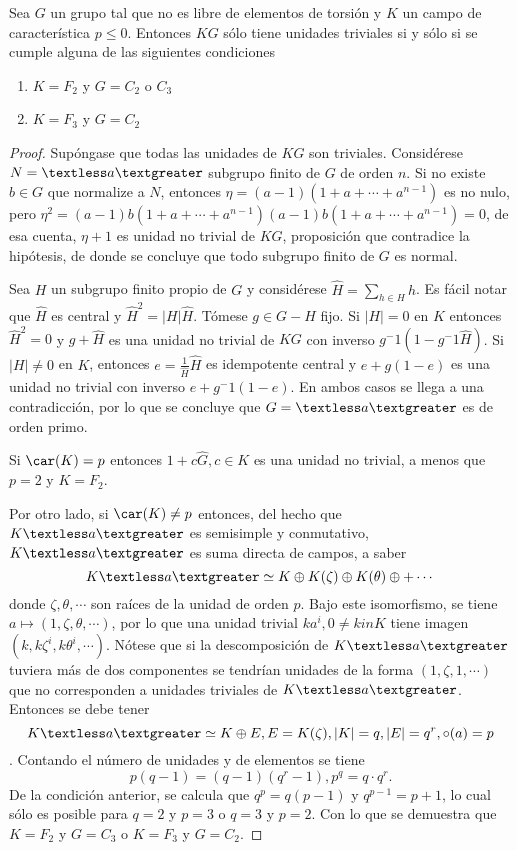 \begin{proposicion}\label{prop:UnidadesTriviales}
Sea $G$ un grupo tal que no es libre de elementos de torsión y $K$ un campo de característica $p\leq 0$. Entonces $KG$ sólo tiene unidades triviales si y sólo si se cumple alguna de las siguientes condiciones
\begin{enumerate}
\item $K=F_2$ y $G=C_2$ o $C_3$
\item $K=F_3$ y $G=C_2$
\end{enumerate}
\end{proposicion}
\begin{proof}
Supóngase que todas las unidades de $KG$ son triviales. Considérese $N=\textless a \textgreater$ subgrupo finito de $G$ de orden $n$. Si no existe $b \in G$ que normalize a $N$, entonces $\eta = (a-1)(1+a+\cdots + a^{n-1})$ es no nulo, pero $\eta^2 = (a-1)b(1+a+\cdots+a^{n-1})(a-1)b(1+a+\cdots+a^{n-1})=0$, de esa cuenta, $\eta +1$ es unidad no trivial de $KG$, proposición que contradice la hipótesis, de donde se concluye que todo subgrupo finito de $G$ es normal.

Sea $H$ un subgrupo finito propio de $G$ y considérese $\hat{H} = \sum_{h \in H}h$. Es fácil notar que  $\hat{H}$ es central y $\hat{H}^2 = |H|\hat{H} $. Tómese $g \in G-H$ fijo. Si $|H| =0$ en $K$ entonces $\hat{H}^2 = 0$ y $g + \hat{H}$ es una unidad no trivial de $KG$ con inverso $g^-1(1-g^-1\hat{H})$. Si $|H| \neq 0$ en $K$, entonces $e = \frac{1}{\hat{H}}\hat{H}$ es idempotente central y $e +g(1-e)$ es una unidad no trivial con inverso $e+g^-1(1-e)$. En ambos casos se llega a una contradicción, por lo que se concluye que $G = \textless a \textgreater$ es de orden primo.

Si $\car (K) = p$ entonces $1+c\hat{G}, c \in K$ es una unidad no trivial, a menos que $p=2$ y $K=F_2$. 

Por otro lado, si $\car(K) \neq p$ entonces, del hecho que $K\textless a \textgreater$ es semisimple y conmutativo, $K\textless a \textgreater$ es suma directa de campos, a saber
\[ K\textless a \textgreater \simeq K\oplus K(\zeta) \oplus K(\theta) \oplus + \cdots \] donde $\zeta, \theta, \cdots$ son raíces de la unidad de orden $p$. Bajo este isomorfismo, se tiene $a \mapsto (1,\zeta,\theta,\cdots)$, por lo que una unidad trivial $ka^ i, 0\neq k in K$ tiene imagen $(k,k\zeta^i,k\theta^i,\cdots)$. Nótese que si la descomposición de $K\textless a\textgreater$ tuviera más de dos componentes se tendrían unidades de la forma $(1,\zeta,1,\cdots)$ que no corresponden a unidades triviales de $K\textless a \textgreater$.
Entonces se debe tener \[ K\textless a \textgreater \simeq K \oplus E, E = K(\zeta), |K|=q, |E|=q^r, \circ(a) = p \]. Contando el número de unidades y de elementos se tiene \[ p(q-1) = (q-1)(q^r-1), p^q = q\cdot q^r. \] De la condición anterior, se calcula que $q^p = q(p-1)$ y $q^{p-1} = p+1$, lo cual sólo es posible para $q=2$ y $p=3$ o $q=3$ y $p=2$. Con lo que se demuestra que $K=F_2$ y $G=C_3$ o $K=F_3$ y $G=C_2$.


\end{proof}

